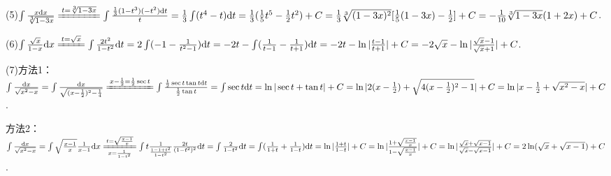 \documentclass[12pt,UTF8]{ctexart}
\begin{document}
\begin{enumerate}
(5)$\int\frac{x\mathrm dx}{\sqrt[3]{1-3x}}\xlongequal{t=\sqrt[3]{1-3x}}\int\frac{\frac13(1-t^3)(-t^2)\mathrm dt}t=\frac13\int(t^4-t)\mathrm dt=\frac13(\frac15t^5-\frac12t^2)+C\\
=\frac13\sqrt[3]{(1-3x)^2}[\frac15(1-3x)-\frac12]+C=-\frac1{10}\sqrt[3]{1-3x}(1+2x)+C$.

(6)$\int\frac{\sqrt x}{1-x}\mathrm dx\xlongequal{t=\sqrt x}\int\frac{2t^2}{1-t^2}\mathrm dt=2\int(-1-\frac1{t^2-1})\mathrm dt=-2t-\int(\frac1{t-1}-\frac1{t+1})\mathrm dt\\
=-2t-\ln|\frac{t-1}{t+1}|+C=-2\sqrt x-\ln|\frac{\sqrt x-1}{\sqrt x+1}|+C$.

(7)方法1：$\int\frac{\mathrm dx}{\sqrt{x^2-x}}=\int\frac{\mathrm dx}{\sqrt{(x-\frac12)^2-\frac14}}\xlongequal{x-\frac12=\frac12\sec t}\int\frac{\frac12\sec t\tan t\mathrm dt}{\frac12\tan t}=\int\sec t\mathrm dt\\
=\ln|\sec t+\tan t|+C=\ln|2(x-\frac12)+\sqrt{4(x-\frac12)^2-1}|+C=\ln|x-\frac12+\sqrt{x^2-x}|+C$.

方法2：$\int\frac{\mathrm dx}{\sqrt{x^2-x}}=\int\sqrt{\frac{x-1}x}\frac1{x-1}\mathrm dx\xlongequal[x=\frac1{1-t^2}]{t=\sqrt{\frac{x-1}x}}\int t\frac1{\frac{1-1+t^2}{1-t^2}}\frac{2t}{(1-t^2)^2}\mathrm dt=\int\frac2{1-t^2}\mathrm dt\\
=\int(\frac1{1+t}+\frac1{1-t})\mathrm dt=\ln|\frac{1+t}{1-t}|+C=\ln|\frac{1+\sqrt{\frac{x-1}x}}{1-\sqrt{\frac{x-1}x}}|+C=\ln|\frac{\sqrt x+\sqrt{x-1}}{\sqrt x-\sqrt{x-1}}|+C\\
=2\ln(\sqrt x+\sqrt{x-1})+C$.
\footnotemark[1]
\end{enumerate}
\end{document}

